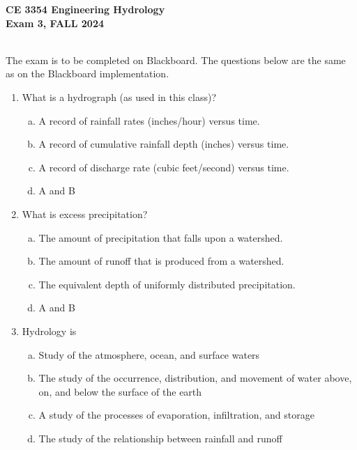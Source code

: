 \documentclass[12pt]{article}
\begin{document}
\begingroup
\begin{centering}
\textbf{CE 3354 Engineering Hydrology} \\
\textbf{Exam 3, FALL 2024}\\
\end{centering}
~\\
The exam is to be completed on Blackboard. The questions below are the same as on the Blackboard implementation.
\endgroup

\begin{enumerate}

\item What is a hydrograph (as used in this class)?
\begin{enumerate}[a)]
\item A record of rainfall rates (inches/hour) versus time.
\item A record of cumulative rainfall depth (inches) versus time.
\item A record of discharge rate (cubic feet/second) versus time.
\item A and B
\end{enumerate}
\clearpage
\item What is excess precipitation?
\begin{enumerate}[a)]
\item The amount of precipitation that falls upon a watershed.
\item The amount of runoff that is produced from a watershed.
\item The equivalent depth of uniformly distributed precipitation.
\item A and B
\end{enumerate}
\clearpage
\item Hydrology is
\begin{enumerate}[a)]
\item Study of the atmosphere, ocean, and surface waters
\item The study of the occurrence, distribution, and movement of water above, on, and below the surface of the earth
\item A study of the processes of evaporation, infiltration, and storage
\item The study of the relationship between rainfall and runoff
\end{enumerate}
\clearpage


\end{enumerate}
\end{document}
